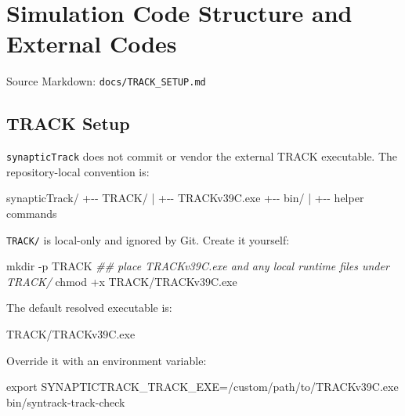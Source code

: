\documentclass[
]{article}
\newenvironment{Shaded}{}{}
\newcommand{\AttributeTok}[1]{\textcolor[rgb]{0.49,0.56,0.16}{#1}}
\newcommand{\BuiltInTok}[1]{\textcolor[rgb]{0.00,0.50,0.00}{#1}}
\newcommand{\CommentTok}[1]{\textcolor[rgb]{0.38,0.63,0.69}{\textit{#1}}}
\newcommand{\ExtensionTok}[1]{#1}
\newcommand{\FunctionTok}[1]{\textcolor[rgb]{0.02,0.16,0.49}{#1}}
\newcommand{\NormalTok}[1]{#1}
\newcommand{\OperatorTok}[1]{\textcolor[rgb]{0.40,0.40,0.40}{#1}}
\newcommand{\VariableTok}[1]{\textcolor[rgb]{0.10,0.09,0.49}{#1}}
\begin{document}
\hypertarget{simulation-code-structure-and-external-codes}{%
\section{Simulation Code Structure and External
Codes}\label{simulation-code-structure-and-external-codes}}

Source Markdown: \texttt{docs/TRACK\_SETUP.md}

\hypertarget{track-setup}{%
\subsection{TRACK Setup}\label{track-setup}}

\texttt{synapticTrack} does not commit or vendor the external TRACK
executable. The repository-local convention is:

\begin{Shaded}
\begin{Highlighting}[]
\NormalTok{synapticTrack/}
\NormalTok{+{-}{-} TRACK/}
\NormalTok{|   +{-}{-} TRACKv39C.exe}
\NormalTok{+{-}{-} bin/}
\NormalTok{|   +{-}{-} helper commands}
\end{Highlighting}
\end{Shaded}

\texttt{TRACK/} is local-only and ignored by Git. Create it yourself:

\begin{Shaded}
\begin{Highlighting}[]
\FunctionTok{mkdir} \AttributeTok{{-}p}\NormalTok{ TRACK}
\CommentTok{\#\# place TRACKv39C.exe and any local runtime files under TRACK/}
\FunctionTok{chmod}\NormalTok{ +x TRACK/TRACKv39C.exe}
\end{Highlighting}
\end{Shaded}

The default resolved executable is:

\begin{Shaded}
\begin{Highlighting}[]
\NormalTok{TRACK/TRACKv39C.exe}
\end{Highlighting}
\end{Shaded}

Override it with an environment variable:

\begin{Shaded}
\begin{Highlighting}[]
\BuiltInTok{export} \VariableTok{SYNAPTICTRACK\_TRACK\_EXE}\OperatorTok{=}\NormalTok{/custom/path/to/TRACKv39C.exe}
\ExtensionTok{bin/syntrack{-}track{-}check}
\end{Highlighting}
\end{Shaded}
\end{document}
